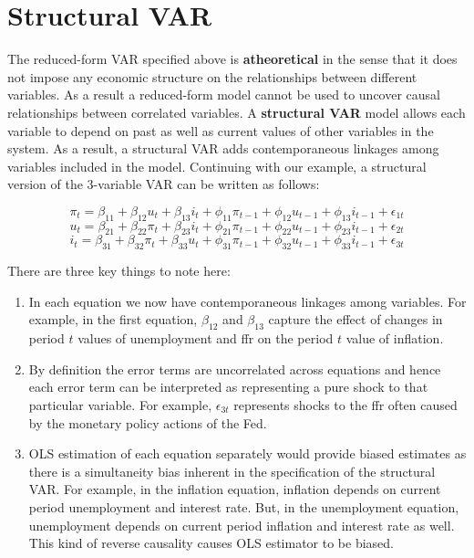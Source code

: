 \documentclass[]{book}
\theoremstyle{definition}
\theoremstyle{definition}
\theoremstyle{definition}
\theoremstyle{remark}
\begin{document}
\hypertarget{structural-var}{%
\section{Structural VAR}\label{structural-var}}

The reduced-form VAR specified above is \textbf{atheoretical} in the sense that it does not impose any economic structure on the relationships between different variables. As a result a reduced-form model cannot be used to uncover causal relationships between correlated variables. A \textbf{structural VAR} model allows each variable to depend on past as well as current values of other variables in the system. As a result, a structural VAR adds contemporaneous linkages among variables included in the model. Continuing with our example, a structural version of the 3-variable VAR can be written as follows:

\[\pi_t = \beta_{11} + \beta_{12} u_t + \beta_{13} i_t + \phi_{11} \pi_{t-1} + \phi_{12} u_{t-1} + \phi_{13} i_{t-1} + \epsilon_{1t}\]
\[u_t = \beta_{21} + \beta_{22} \pi_t+ \beta_{23} i_t+\phi_{21} \pi_{t-1} + \phi_{22} u_{t-1} + \phi_{23} i_{t-1} + \epsilon_{2t}\]
\[i_t = \beta_{31} + \beta_{32}\pi_t + \beta_{33}u_t+ \phi_{31} \pi_{t-1} + \phi_{32} u_{t-1} + \phi_{33} i_{t-1} + \epsilon_{3t}\]

There are three key things to note here:

\begin{enumerate}
\def\labelenumi{\arabic{enumi}.}
\item
  In each equation we now have contemporaneous linkages among variables. For example, in the first equation, \(\beta_{12}\) and \(\beta_{13}\) capture the effect of changes in period \(t\) values of unemployment and ffr on the period \(t\) value of inflation.
\item
  By definition the error terms are uncorrelated across equations and hence each error term can be interpreted as representing a pure shock to that particular variable. For example, \(\epsilon_{3t}\) represents shocks to the ffr often caused by the monetary policy actions of the Fed.\\
\item
  OLS estimation of each equation separately would provide biased estimates as there is a simultaneity bias inherent in the specification of the structural VAR. For example, in the inflation equation, inflation depends on current period unemployment and interest rate. But, in the unemployment equation, unemployment depends on current period inflation and interest rate as well. This kind of reverse causality causes OLS estimator to be biased.
\end{enumerate}
\end{document}
